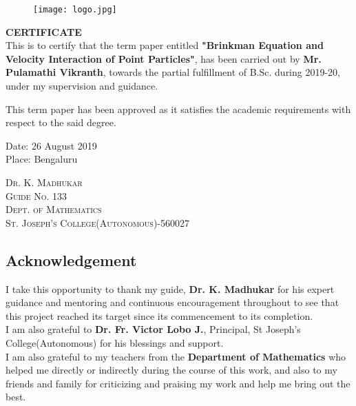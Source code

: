 \documentclass[12pt]{article}
\begin{document}
\begin{figure}[H]
    \centering
    \texttt{[image: logo.jpg]}
  \end{figure}
\vspace{5mm}
\begin{center}
\textbf{CERTIFICATE}\\
\vspace{10mm}
This is to certify that the term paper entitled \textbf{"Brinkman Equation and Velocity Interaction of Point Particles"}, has been carried out by \textbf{Mr. Pulamathi Vikranth}, towards the partial fulfillment of B.Sc. during 2019-20, under my supervision and guidance.

This term paper has been approved as it satisfies the academic requirements with respect to the said degree.
\end{center}

\begin{flushleft}
Date: 26 August 2019\\
Place: Bengaluru
\end{flushleft}
\vspace{10mm}
\begin{flushright}
\textsc{Dr. K. Madhukar\\ Guide No. 133\\Dept. of Mathematics\\ St. Joseph's College(Autonomous)-560027}
\end{flushright}



\cleardoublepage


\begin{center}
\section*{Acknowledgement}
\end{center}



\begin{center}
\vspace{50mm}
I take this opportunity to thank my guide, \textbf{Dr. K. Madhukar} for his expert guidance and mentoring and continuous encouragement throughout to see that this project reached its target since its commencement to its completion.\\
\vspace{10mm}
I am also grateful to \textbf{Dr. Fr. Victor Lobo J.},
Principal, St Joseph's College(Autonomous) for his blessings and support. \\
\vspace{10mm}
I am also grateful to my teachers from the \textbf{Department of Mathematics} who helped me directly or indirectly during the
course of this work, and also to my friends and family for criticizing and praising my work and help me bring out the best. 

\end{center}
\end{document}

